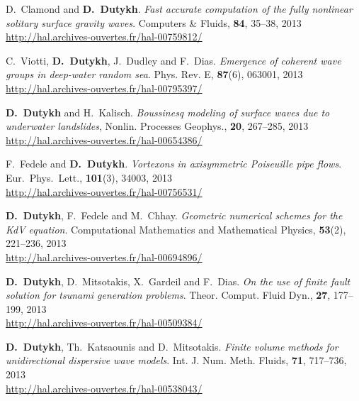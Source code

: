 \documentclass[final, a4paper, oneside, 12pt]{article}
\numberwithin{equation}{section}
\begin{document}
\begin{etaremune}
  \item D.~Clamond and \textbf{D.~Dutykh}. \textit{Fast accurate computation of the fully nonlinear solitary surface gravity waves}. Computers \& Fluids, \textbf{84}, 35--38, 2013 \\ %
  \url{http://hal.archives-ouvertes.fr/hal-00759812/}
  
  \item C.~Viotti, \textbf{D.~Dutykh}, J.~Dudley and F.~Dias. \textit{Emergence of coherent wave groups in deep-water random sea}. Phys. Rev. E, \textbf{87}(6), 063001, 2013 \\ %
  \url{http://hal.archives-ouvertes.fr/hal-00795397/}
  
  \item \textbf{D.~Dutykh} and H.~Kalisch. \textit{Boussinesq modeling of surface waves due to underwater landslides}, Nonlin. Processes Geophys., \textbf{20}, 267--285, 2013 \\ %
  \url{http://hal.archives-ouvertes.fr/hal-00654386/}

  \item F.~Fedele and \textbf{D.~Dutykh}. \textit{Vortexons in axisymmetric Poiseuille pipe flows}. Eur.~Phys.~Lett., \textbf{101}(3), 34003, 2013 \\ %
  \url{http://hal.archives-ouvertes.fr/hal-00756531/}
  
  \item \textbf{D.~Dutykh}, F.~Fedele and M.~Chhay. \textit{Geometric numerical schemes for the KdV equation}. Computational Mathematics and Mathematical Physics, \textbf{53}(2), 221--236, 2013 \\ %
  \url{http://hal.archives-ouvertes.fr/hal-00694896/}
  
  \item \textbf{D.~Dutykh}, D.~Mitsotakis, X.~Gardeil and F.~Dias. \textit{On the use of finite fault solution for tsunami generation problems}. Theor. Comput. Fluid Dyn., \textbf{27}, 177--199, 2013 \\ %
  \url{http://hal.archives-ouvertes.fr/hal-00509384/}

  \item \textbf{D.~Dutykh}, Th.~Katsaounis and D.~Mitsotakis. \textit{Finite volume methods for unidirectional dispersive wave models}. Int. J. Num. Meth. Fluids, \textbf{71}, 717--736, 2013 \\ %
  \url{http://hal.archives-ouvertes.fr/hal-00538043/}
  

\end{etaremune}
\end{document}
